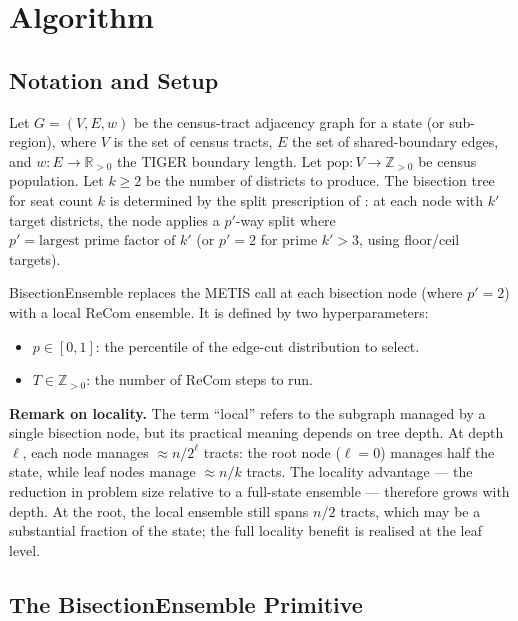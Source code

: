 \section{Algorithm}
\label{sec:algorithm}

\subsection{Notation and Setup}
\label{sec:alg:notation}

Let $G = (V, E, w)$ be the census-tract adjacency graph for a state (or
sub-region), where $V$ is the set of census tracts, $E$ the set of
shared-boundary edges, and $w: E \to \mathbb{R}_{>0}$ the TIGER boundary length.
Let $\text{pop}: V \to \mathbb{Z}_{>0}$ be census population.
Let $k \geq 2$ be the number of districts to produce.
The bisection tree for seat count $k$ is determined by the split prescription
of \citet{dellaLibera2026apportion}: at each node with $k'$ target districts,
the node applies a $p'$-way split where $p' = \text{largest prime factor of } k'$
(or $p' = 2$ for prime $k' > 3$, using floor/ceil targets).

BisectionEnsemble replaces the METIS call at each bisection node (where $p' = 2$)
with a local ReCom ensemble. It is defined by two hyperparameters:
\begin{itemize}
  \item $p \in [0, 1]$: the percentile of the edge-cut distribution to select.
  \item $T \in \mathbb{Z}_{>0}$: the number of ReCom steps to run.
\end{itemize}

\noindent\textbf{Remark on locality.}
The term ``local'' refers to the subgraph managed by a single bisection node,
but its practical meaning depends on tree depth. At depth $\ell$, each node
manages $\approx n/2^\ell$ tracts: the root node ($\ell=0$) manages half the
state, while leaf nodes manage $\approx n/k$ tracts. The locality advantage
--- the reduction in problem size relative to a full-state ensemble --- therefore
grows with depth. At the root, the local ensemble still spans $n/2$ tracts, which
may be a substantial fraction of the state; the full locality benefit is realised
at the leaf level.

\subsection{The BisectionEnsemble Primitive}
\label{sec:alg:primitive}

